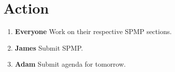 \documentclass{article}
\begin{document}
\section{Action}
\begin{enumerate}
\item \textbf{Everyone} Work on their respective SPMP sections.
\item \textbf{James} Submit SPMP.
\item \textbf{Adam} Submit agenda for tomorrow.
\end{enumerate}
\end{document}
